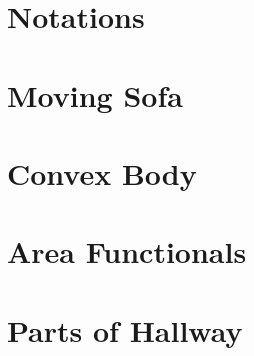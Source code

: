 
\section{Notations}
\label{sec:notations}


\section{Moving Sofa}
\label{sec:moving-sofa}


\section{Convex Body}
\label{sec:convex-body}


\section{Area Functionals}
\label{sec:area-functionals}


\section{Parts of Hallway}
\label{sec:parts-of-hallway}



